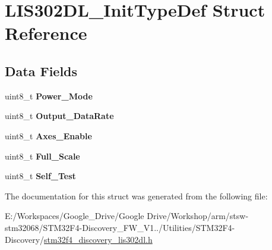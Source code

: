 \hypertarget{struct_l_i_s302_d_l___init_type_def}{\section{L\-I\-S302\-D\-L\-\_\-\-Init\-Type\-Def Struct Reference}
\label{struct_l_i_s302_d_l___init_type_def}
}
\subsection*{Data Fields}
\begin{DoxyCompactItemize}
\item 
\hypertarget{struct_l_i_s302_d_l___init_type_def_abfbc6374692a32d82fc23fc80daa97fa}{uint8\-\_\-t {\bfseries Power\-\_\-\-Mode}}\label{struct_l_i_s302_d_l___init_type_def_abfbc6374692a32d82fc23fc80daa97fa}

\item 
\hypertarget{struct_l_i_s302_d_l___init_type_def_ae8e732e414bb7ffcfa03962a2d32dbaf}{uint8\-\_\-t {\bfseries Output\-\_\-\-Data\-Rate}}\label{struct_l_i_s302_d_l___init_type_def_ae8e732e414bb7ffcfa03962a2d32dbaf}

\item 
\hypertarget{struct_l_i_s302_d_l___init_type_def_a103d0534b3d5ccc745dedbbb450c95fd}{uint8\-\_\-t {\bfseries Axes\-\_\-\-Enable}}\label{struct_l_i_s302_d_l___init_type_def_a103d0534b3d5ccc745dedbbb450c95fd}

\item 
\hypertarget{struct_l_i_s302_d_l___init_type_def_af2604031b3502b264752dadbc519c23c}{uint8\-\_\-t {\bfseries Full\-\_\-\-Scale}}\label{struct_l_i_s302_d_l___init_type_def_af2604031b3502b264752dadbc519c23c}

\item 
\hypertarget{struct_l_i_s302_d_l___init_type_def_ab6bbbc45a83f29be40a87253dc5da616}{uint8\-\_\-t {\bfseries Self\-\_\-\-Test}}\label{struct_l_i_s302_d_l___init_type_def_ab6bbbc45a83f29be40a87253dc5da616}

\end{DoxyCompactItemize}


The documentation for this struct was generated from the following file\-:\begin{DoxyCompactItemize}
\item 
E\-:/\-Workspaces/\-Google\-\_\-\-Drive/\-Google Drive/\-Workshop/arm/stsw-\/stm32068/\-S\-T\-M32\-F4-\/\-Discovery\-\_\-\-F\-W\-\_\-\-V1../\-Utilities/\-S\-T\-M32\-F4-\/\-Discovery/\hyperlink{stm32f4__discovery__lis302dl_8h}{stm32f4\-\_\-discovery\-\_\-lis302dl.\-h}\end{DoxyCompactItemize}
